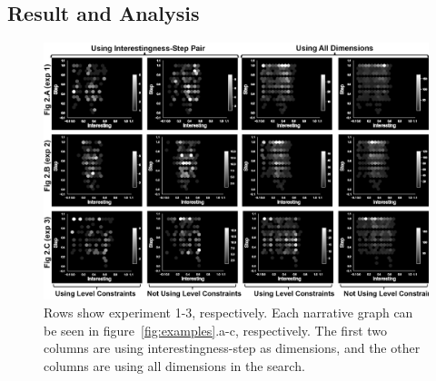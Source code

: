 \subsection{Result and Analysis}

\begin{figure}[h]
    \centering
    \includegraphics[width=\linewidth]{figures/experiment-123_fixed.png}
    \caption{Rows show experiment 1-3, respectively. Each narrative graph can be seen in figure~\ref{fig:examples}.a-c, respectively. The first two columns are using interestingness-step as dimensions, and the other columns are using all dimensions in the search.}
    \label{fig:experiment123}
\end{figure}

